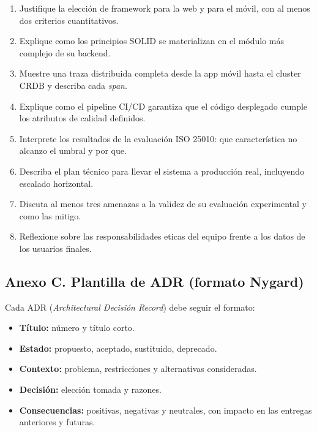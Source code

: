 \documentclass[11pt,a4paper]{article}
\begin{document}
    \begin{enumerate}
        \item Justifique la elección de framework para la web y para el móvil, con al menos dos criterios cuantitativos.
        \item Explique como los principios SOLID se materializan en el módulo más complejo de su backend.
        \item Muestre una traza distribuida completa desde la app móvil hasta el cluster CRDB y describa cada \textit{span}.
        \item Explique como el pipeline CI/CD garantiza que el código desplegado cumple los atributos de calidad definidos.
        \item Interprete los resultados de la evaluación ISO 25010: que característica no alcanzo el umbral y por que.
        \item Describa el plan técnico para llevar el sistema a producción real, incluyendo escalado horizontal.
        \item Discuta al menos tres amenazas a la validez de su evaluación experimental y como las mitigo.
        \item Reflexione sobre las responsabilidades eticas del equipo frente a los datos de los usuarios finales.
    \end{enumerate}

\subsection*{Anexo C. Plantilla de ADR (formato Nygard)}

    Cada ADR (\emph{Architectural Decisión Record}) debe seguir el formato:
    \begin{itemize}
        \item \textbf{Título:} número y título corto.
        \item \textbf{Estado:} propuesto, aceptado, sustituido, deprecado.
        \item \textbf{Contexto:} problema, restricciones y alternativas consideradas.
        \item \textbf{Decisión:} elección tomada y razones.
        \item \textbf{Consecuencias:} positivas, negativas y neutrales, con impacto en las entregas anteriores y futuras.
    \end{itemize}



\end{document}
